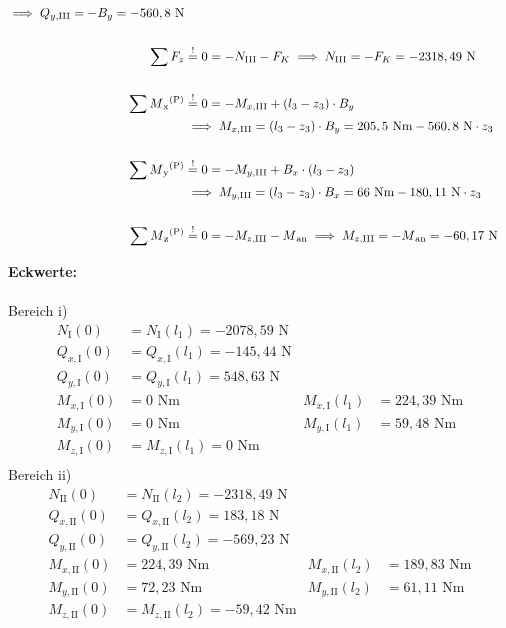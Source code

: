 \begin{enumerate}
\begin{align*}
				\implies Q_{y,\mathrm{III}} = -B_y = -560,8 \text{ N}\\ \\
		\sum F_z &\overset{!}{=} 0 = -N_{\mathrm{III}} -F_K
				\implies N_{\mathrm{III}} = -F_K = -2318,49 \text{ N} \\ \\
        \sum M\textsubscript{x}\textsuperscript{(P)} &\overset{!}{=} 0 =- M_{x,\mathrm{III}} +(l_3-z_3) \cdot B_y \\
				&\implies M_{x,\mathrm{III}} = (l_3-z_3) \cdot B_y = 205,5 \text{ Nm} -560,8 \text{ N} \cdot z_3 \\ \\
		\sum M\textsubscript{y}\textsuperscript{(P)} &\overset{!}{=} 0 =- M_{y,\mathrm{III}} + B_x \cdot (l_3-z_3) \\
				&\implies M_{y,\mathrm{III}} = (l_3 -z_3) \cdot B_x =66 \text{ Nm} -180,11 \text{ N} \cdot z_3\\ \\
		\sum M\textsubscript{z}\textsuperscript{(P)} &\overset{!}{=} 0 = - M_{z,\mathrm{III}} - M\textsubscript{an}
				\implies  M_{z,\mathrm{III}} = -M\textsubscript{an} = -60,17 \text{ N}\\
	\end{align*}
\end{enumerate}
\newpage
\textbf{Eckwerte:}\\ \\
Bereich i)
\begin{align*}
	N_{\mathrm{I}} (0) &= N_{\mathrm{I}} (l_1) = -2078,59 \text{ N}\\
	Q_{x,\mathrm{I}} (0) &= Q_{x,\mathrm{I}} (l_1) = -145,44\text{ N}\\
	Q_{y,\mathrm{I}} (0) &= Q_{y,\mathrm{I}} (l_1) = 548,63\text{ N}\\
	M_{x,\mathrm{I}} (0) &=  0\text{ Nm} & M_{x,\mathrm{I}} (l_1) &= 224,39\text{ Nm}\\
	M_{y,\mathrm{I}} (0) &=  0\text{ Nm} & M_{y,\mathrm{I}} (l_1) &= 59,48\text{ Nm}\\
	M_{z,\mathrm{I}} (0) &= M_{z,\mathrm{I}} (l_1) = 0\text{ Nm}\\
\end{align*}
Bereich ii)
\begin{align*}
	N_{\mathrm{II}} (0) &= N_{\mathrm{II}} (l_2) = -2318,49 \text{ N}\\
	Q_{x,\mathrm{II}} (0) &= Q_{x,\mathrm{II}} (l_2) = 183,18\text{ N}\\
	Q_{y,\mathrm{II}} (0) &= Q_{y,\mathrm{II}} (l_2) = -569,23\text{ N}\\
	M_{x,\mathrm{II}} (0) &= 224,39\text{ Nm} & M_{x,\mathrm{II}} (l_2) &= 189,83\text{ Nm}\\
	M_{y,\mathrm{II}} (0) &=  72,23\text{ Nm} & M_{y,\mathrm{II}} (l_2) &= 61,11\text{ Nm}\\
	M_{z,\mathrm{II}} (0) &= M_{z,\mathrm{II}} (l_2) = -59,42\text{ Nm}\\
\end{align*}
